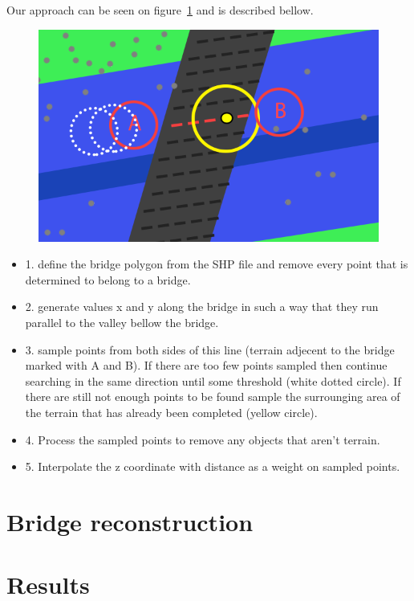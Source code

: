 \documentclass{egpubl-eurovis-star}
\begin{document}
Our approach can be seen on figure~\ref{fig2} and is described bellow.
\begin{figure}[ht]
    \centering
    \includegraphics[width=1\columnwidth]{bridge.png}
    \caption{ }
    \label{fig2}
\end{figure}
\begin{itemize}
\item{1. define the bridge polygon from the SHP file and remove every point that is determined to belong to a bridge.}
\item{2. generate values x and y along the bridge in such a way that they run parallel to the valley bellow the bridge. }
\item{3. sample points from both sides of this line (terrain adjecent to the bridge marked with A and B). 
If there are too few points sampled then continue searching in the same direction until some threshold (white dotted circle).
If there are still not enough points to be found sample the surrounging area of the terrain that has already been completed (yellow circle).}
\item{4. Process the sampled points to remove any objects that aren't terrain.}
\item{5. Interpolate the z coordinate with distance as a weight on sampled points.}
\end{itemize}





\section{Bridge reconstruction}




\section{Results}
\end{document}
